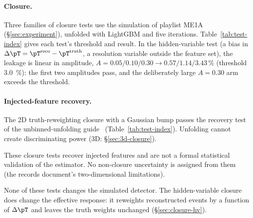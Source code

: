 \paragraph{Closure.} Three families of closure tests use the simulation of playlist ME1A (\S\ref{sec:experiment}), unfolded with LightGBM and five iterations. Table~\ref{tab:test-index} gives each test's threshold and result. In the hidden-variable test (a bias in $\Delta\pT=\pT^{\mathrm{reco}}-\pT^{\mathrm{truth}}$, a resolution variable outside the feature set), the leakage is linear in amplitude, $A=0.05/0.10/0.30\to0.57/1.14/3.43\,\%$ (threshold \SI{3.0}{\percent}): the first two amplitudes pass, and the deliberately large $A=0.30$ arm exceeds the threshold.

\paragraph{Injected-feature recovery.} The 2D truth-reweighting closure with a Gaussian bump passes the recovery test of the unbinned-unfolding guide~\cite{Canelli:2025guide} (Table~\ref{tab:test-index}). Unfolding cannot create discriminating power (3D: \S\ref{sec:3d-closure}).



These closure tests recover injected features and are not a formal statistical validation of the estimator. No non-closure uncertainty is assigned from them (the records document's two-dimensional limitations).

None of these tests changes the simulated detector. The hidden-variable closure does change the effective response: it reweights reconstructed events by a function of $\Delta\pT$ and leaves the truth weights unchanged (\S\ref{sec:closure-hv}).

